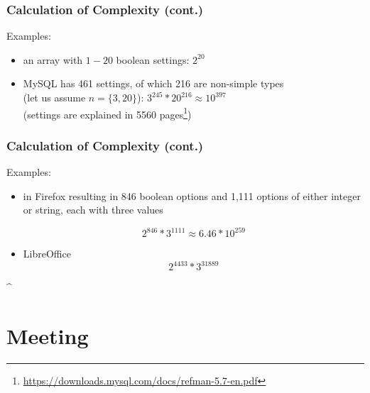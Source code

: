 \begin{frame}
	\frametitle{Calculation of Complexity (cont.)}

	Examples:
	\begin{itemize}
	\item an array with $1-20$ boolean settings:
	\pause
	$2^{20}$

	\item MySQL has 461 settings, of which 216 are non-simple types~\cite{xu2015hey} \\ (let us assume $n=\{3,20\}$):
	\pause
	$3^{245} * 20^{216} \approx 10^{397}$ \\
	(settings are explained in 5560 pages\footnote{\url{https://downloads.mysql.com/docs/refman-5.7-en.pdf}})
	\end{itemize}
\end{frame}

\begin{frame}
	\frametitle{Calculation of Complexity (cont.)~\cite{jin2014configurations}}

	Examples:
	\begin{itemize}
	\item in Firefox resulting in 846 boolean options and 1,111 options of either integer or string, each with three values

	\pause
	$$2^{846}*3^{1111} \approx 6.46 * 10^{259}$$

	\item LibreOffice
	\pause
	$$2^{4433} * 3^{31889}$$
	\end{itemize}
\end{frame}
\lstMakeShortInline[postbreak=,keywordstyle={},showspaces=no]^




\section{Meeting}

